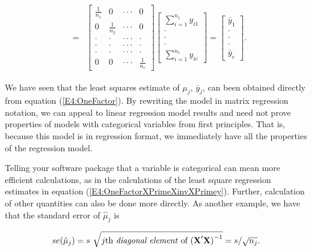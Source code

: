 \begin{center}
\begin{eqnarray}
\\
&=&%
\begin{bmatrix}
\frac{1}{n_1} & 0 & \cdot \cdot \cdot  & 0 \\
0 & \frac{1}{n_2} & \cdot \cdot \cdot  & 0 \\
\cdot  & \cdot  & \cdot \cdot \cdot  & \cdot  \\
\cdot  & \cdot  & \cdot \cdot \cdot  & \cdot  \\
\cdot  & \cdot  & \cdot \cdot \cdot  & \cdot  \\
0 & 0 & \cdot \cdot \cdot  & \frac{1}{n_c}
\end{bmatrix}
\begin{bmatrix}
\sum_{i=1}^{n_1}y_{i1} \\
\cdot  \\
\cdot  \\
\cdot  \\
\sum_{i=1}^{n_{c}}y_{ic}%
\end{bmatrix}%
=%
\begin{bmatrix}
\bar{y}_1 \\
\cdot  \\
\cdot  \\
\cdot  \\
\bar{y}_c
\end{bmatrix} .
\end{eqnarray}
\end{center}

We have seen that the least squares estimate of $\mu_j$,
$\bar{y}_j$, can been obtained directly from equation
(\ref{E4:OneFactor}). By rewriting the model in matrix regression
notation, we can appeal to linear regression model results and need
not prove properties of models with categorical variables from first
principles. That is, because this model is in regression format, we
immediately have all the properties of the regression model.

Telling your software package that a variable is categorical can
mean more efficient calculations, as in the calculations of the least
square regression estimates in equation (\ref{E4:OneFactorXPrimeXinvXPrimey}).
Further, calculation of other quantities can also be done more directly.
As another example, we have that the standard
error of $\hat{\mu}_j$ is

\begin{equation*}
se(\hat{\mu}_j) = s ~ \sqrt{j\text{th \textit{diagonal element} of }
\mathbf{(X}^{\prime}\mathbf{X)}^{-1}} = s/\sqrt{n_j}.
\end{equation*}

